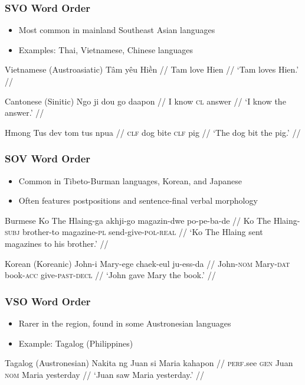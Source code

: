 \documentclass{beamer}
\begin{document}
\begin{frame}
\frametitle[allowframebreaks]{SVO Word Order}
\begin{itemize}
\item Most common in mainland Southeast Asian languages
\item Examples: Thai, Vietnamese, Chinese languages
\end{itemize}
\begin{exampleblock}{Vietnamese (Austroasiatic)}
  \ex
  \begingl
\gla Tâm yêu Hiền //
\glb Tam love Hien //
\glft `Tam loves Hien.' //
\endgl
\xe
\end{exampleblock}

\framebreak

\begin{exampleblock}{Cantonese (Sinitic)}
\begingl
\gla Ngo ji dou go daapon //
\glb I know \textsc{cl} answer //
\glft `I know the answer.' //
\endgl
\end{exampleblock}
\begin{exampleblock}{Hmong}
\begingl
\gla Tus dev tom tus npua //
\glb \textsc{clf} dog bite \textsc{clf} pig //
\glft `The dog bit the pig.' //
\endgl
\end{exampleblock}
\end{frame}

\begin{frame}
\frametitle{SOV Word Order}
\begin{itemize}
\item Common in Tibeto-Burman languages, Korean, and Japanese
\item Often features postpositions and sentence-final verbal morphology
\end{itemize}
\begin{exampleblock}{Burmese}
\begingl
\gla Ko The Hlaing-ga akhji-go magazin-dwe po-pe-ba-de //
\glb Ko The Hlaing-\textsc{subj} brother-to magazine-\textsc{pl} send-give-\textsc{pol}-\textsc{real} //
\glft `Ko The Hlaing sent magazines to his brother.' //
\endgl
\end{exampleblock}
\begin{exampleblock}{Korean (Koreanic)}
\begingl
\gla John-i Mary-ege chaek-eul ju-ess-da //
\glb John-\textsc{nom} Mary-\textsc{dat} book-\textsc{acc} give-\textsc{past-decl} //
\glft `John gave Mary the book.' //
\endgl
\end{exampleblock}
\end{frame}

\begin{frame}
\frametitle{VSO Word Order}
\begin{itemize}
\item Rarer in the region, found in some Austronesian languages
\item Example: Tagalog (Philippines)
\end{itemize}
\begin{exampleblock}{Tagalog (Austronesian)}
\begingl
\gla Nakita ng Juan si Maria kahapon //
\glb \textsc{perf}.see \textsc{gen} Juan \textsc{nom} Maria yesterday //
\glft `Juan saw Maria yesterday.' //
\endgl
\end{exampleblock}
\end{frame}
\end{document}
